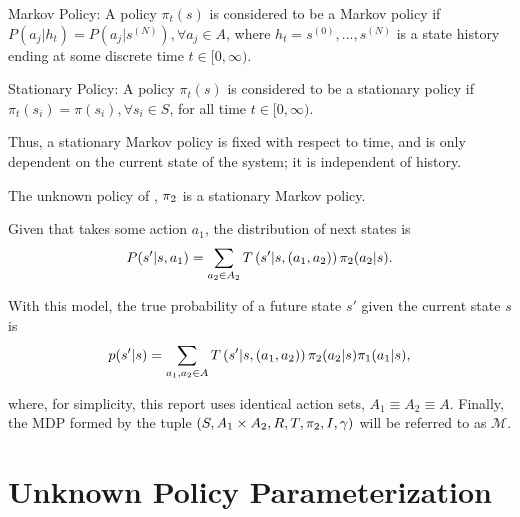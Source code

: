     \begin{definition}{Markov Policy:} \label{def:markov_policy}
        A policy $\pi_t(s)$ is considered to be a Markov policy if $P(a_j|h_t) = P(a_j|s^{(N)}), \forall a_j \in A$,
        where $h_t = s^{(0)},...,s^{(N)}$ is a state history ending at some discrete time $t \in [0,\infty)$.
    \end{definition}

    \begin{definition}{Stationary Policy:} \label{def:stationary_policy}
        A policy $\pi_t(s)$ is considered to be a stationary policy if $\pi_t(s_i) = \pi(s_i), \forall s_i \in S$,
        for all time $t \in [0,\infty)$.
    \end{definition}

    Thus, a stationary Markov policy is fixed with respect to time, and is only dependent on the current state of
    the system; it is independent of history.

    \begin{assumption}\label{assump:stationary_markov}
        The unknown policy of , $\pi_{2}$ is a stationary Markov policy.
    \end{assumption}

    Given that  takes some action $a_1$, the distribution of next states is
    \begin{equation}\label{eq:true_state_action_trans_prob}
        P(s'| s, a_1) = \sum_{a_2\in A_2} T\left(s'|s, (a_1,a_2)\right)\pi_{2}(a_2|s).
    \end{equation}

    \noindent
    With this model, the true probability of a future state $s'$ given the current state $s$ is
    \begin{equation}\label{eq:true_state_trans_prob}
        p(s'|s) = \sum_{a_1, a_2 \in A} T \left(s'|s, (a_1,a_2)\right)\pi_{2}(a_2|s)\pi_{1}(a_1|s),
    \end{equation}

    \noindent
    where, for simplicity, this report uses identical action sets, $A_1 \equiv A_2 \equiv A$. Finally, the \ac{MDP}
    formed by the tuple $(S, A_1 \times A_2, R, T, \pi_{2}, I , \gamma)$ will be referred to as $\mathcal{M}$.

\section{Unknown Policy Parameterization}

